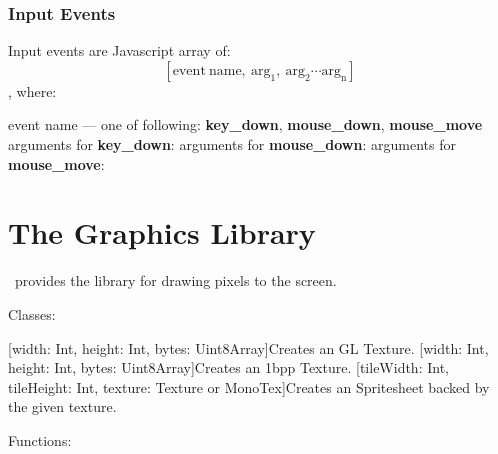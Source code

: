 \subsection{Input Events}

Input events are Javascript array of: $$ [\mathrm{event\ name,\ arg_1,\ arg_2 \cdots arg_n}] $$, where:

\begin{outline}
\1event name --- one of following: \textbf{key\_down}, \textbf{mouse\_down}, \textbf{mouse\_move}
\1arguments for \textbf{key\_down}:
 \2
 \2
 \2
\1arguments for \textbf{mouse\_down}:
 \2
 \2
 \2
\1arguments for \textbf{mouse\_move}:
 \2
 \2
 \2
 \2
 \2
\end{outline}



\chapter{The Graphics Library}

\thedos\ provides the library for drawing pixels to the screen.


Classes:

\begin{outline}
\1[width: Int, height: Int, bytes: Uint8Array]{Creates an GL Texture.}
\1[width: Int, height: Int, bytes: Uint8Array]{Creates an 1bpp Texture.}
\1[tileWidth: Int, tileHeight: Int, texture: Texture or MonoTex]{Creates an Spritesheet backed by the given texture.}
\end{outline}

Functions:

